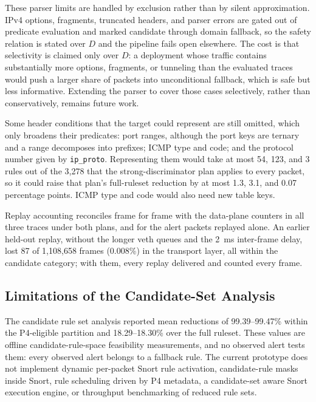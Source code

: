 \documentclass{article}
\begin{document}
These parser limits are handled by exclusion rather than by silent
approximation. IPv4 options, fragments, truncated headers, and parser errors
are gated out of predicate evaluation and marked candidate through domain
fallback, so the safety relation is stated over $D$ and the pipeline fails
open elsewhere. The cost is that selectivity is claimed only over $D$: a
deployment whose traffic contains substantially more options, fragments, or
tunneling than the evaluated traces would push a larger share of packets
into unconditional fallback, which is safe but less informative. Extending
the parser to cover those cases selectively, rather than conservatively,
remains future work.

Some header conditions that the target could represent are still omitted,
which only broadens their predicates: port ranges, although the port keys
are ternary and a range decomposes into prefixes; ICMP type and code; and
the protocol number given by \texttt{ip\_proto}. Representing them would
take at most 54, 123, and 3 rules out of the 3,278 that the
strong-discriminator plan applies to every packet, so it could raise that
plan's full-ruleset reduction by at most 1.3, 3.1, and 0.07 percentage
points. ICMP type and code would also need new table keys.

Replay accounting reconciles frame for frame with the data-plane counters in
all three traces under both plans, and for the alert packets replayed alone.
An earlier held-out replay, without the longer veth queues and the 2~ms
inter-frame delay, lost 87 of 1,108,658 frames (0.008\%) in the transport
layer, all within the candidate category; with them, every replay delivered
and counted every frame.

\subsection{Limitations of the Candidate-Set Analysis}
The candidate rule set analysis reported mean reductions of 99.39--99.47\%
within the P4-eligible partition and 18.29--18.30\% over the full ruleset.
These values are offline candidate-rule-space feasibility measurements, and
no observed alert tests them: every observed alert belongs to a fallback
rule. The current prototype does not implement dynamic
per-packet Snort rule activation, candidate-rule masks inside Snort, rule
scheduling driven by P4 metadata, a candidate-set aware Snort execution
engine, or throughput benchmarking of reduced rule sets.
\end{document}
